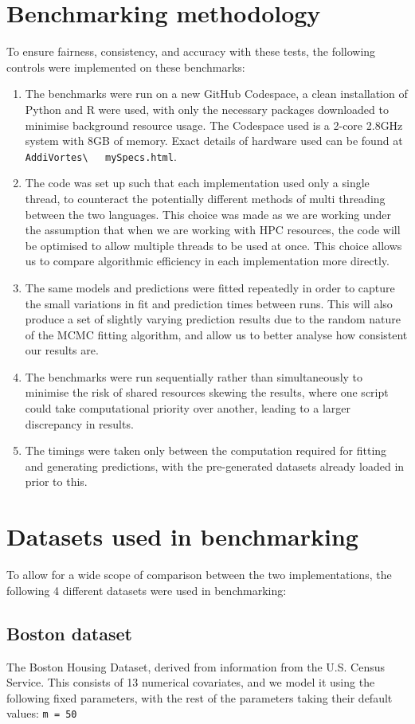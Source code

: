 \documentclass[11pt,twoside,a4paper]{article}
\begin{document}
\section{Benchmarking methodology}
To ensure fairness, consistency, and accuracy with these tests, the following controls were implemented on these benchmarks:
\begin{enumerate}
	\item The benchmarks were run on a new GitHub Codespace, a clean installation of Python and R were used, with only the necessary packages downloaded to minimise background resource usage. The Codespace used is a 2-core 2.8GHz system with 8GB of memory. Exact details of hardware used can be found at \nolinkurl{AddiVortes\   mySpecs.html}.
	\item The code was set up such that each implementation used only a single thread, to counteract the potentially different methods of multi threading between the two languages. This choice was made as we are working under the assumption that when we are working with HPC resources, the code will be optimised to allow multiple threads to be used at once. This choice allows us to compare algorithmic efficiency in each implementation more directly.
	\item The same models and predictions were fitted repeatedly in order to capture the small variations in fit and prediction times between runs. This will also produce a set of slightly varying prediction results due to the random nature of the MCMC fitting algorithm, and allow us to better analyse how consistent our results are.
	\item The benchmarks were run sequentially rather than simultaneously to minimise the risk of shared resources skewing the results, where one script could take computational priority over another, leading to a larger discrepancy in results.
	\item The timings were taken only between the computation required for fitting and generating predictions, with the pre-generated datasets already loaded in prior to this.
\end{enumerate}
\newpage
\section{Datasets used in benchmarking}
To allow for a wide scope of comparison between the two implementations, the following 4 different datasets were used in benchmarking:
\subsection{Boston dataset}
The Boston Housing Dataset, derived from information from the U.S. Census Service. This consists of 13 numerical covariates, and we model it using the following fixed parameters, with the rest of the parameters taking their default values: \texttt{m = 50}
\end{document}
